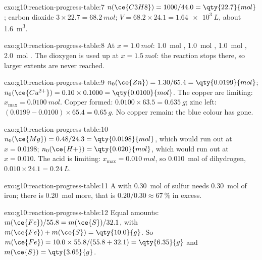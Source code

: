 \begin{solution}{exo:g10:reaction-progress-table:7}
$n(\ce{C3H8}) = 1000 / 44.0 = \qty{22.7}{mol}$; carbon dioxide
$3 \times 22.7 = \qty{68.2}{mol}$; $V = 68.2 \times 24.1 =
\qty{1.64e3}{L}$, about \qty{1.6}{m^3}.
\end{solution}

\begin{solution}{exo:g10:reaction-progress-table:8}
At $x = \qty{1.0}{mol}$: \qty{1.0}{mol} , \qty{1.0}{mol}
, \qty{1.0}{mol} , \qty{2.0}{mol} . The dioxygen
is used up at $x = \qty{1.5}{mol}$: the reaction stops there, so larger
extents are never reached.
\end{solution}

\begin{solution}{exo:g10:reaction-progress-table:9}
$n_0(\ce{Zn}) = 1.30 / 65.4 = \qty{0.0199}{mol}$;
$n_0(\ce{Cu^{2+}}) = 0.10 \times 0.1000 = \qty{0.0100}{mol}$. The copper
 are limiting: $x_{\max} = \qty{0.0100}{mol}$. Copper formed:
$0.0100 \times 63.5 = \qty{0.635}{g}$; zinc left:
$(0.0199 - 0.0100) \times 65.4 = \qty{0.65}{g}$. No copper  remain:
the blue colour has gone.
\end{solution}

\begin{solution}{exo:g10:reaction-progress-table:10}
$n_0(\ce{Mg}) = 0.48 / 24.3 = \qty{0.0198}{mol}$, which would run out at
$x = 0.0198$; $n_0(\ce{H+}) = \qty{0.020}{mol}$, which would run out at
$x = 0.010$. The acid is limiting: $x_{\max} = \qty{0.010}{mol}$, so
\qty{0.010}{mol} of dihydrogen, $0.010 \times 24.1 = \qty{0.24}{L}$.
\end{solution}

\begin{solution}{exo:g10:reaction-progress-table:11}
A  with \qty{0.30}{mol} of sulfur needs
\qty{0.30}{mol} of iron; there is \qty{0.20}{mol} more, that is
$0.20 / 0.30 \approx \qty{67}{\percent}$ in excess.
\end{solution}

\begin{solution}{exo:g10:reaction-progress-table:12}
Equal amounts: $m(\ce{Fe})/55.8 = m(\ce{S})/32.1$, with
$m(\ce{Fe}) + m(\ce{S}) = \qty{10.0}{g}$. So
$m(\ce{Fe}) = 10.0 \times 55.8 / (55.8 + 32.1) = \qty{6.35}{g}$ and
$m(\ce{S}) = \qty{3.65}{g}$.
\end{solution}

